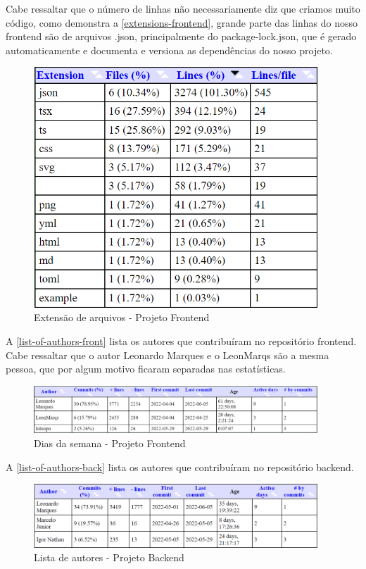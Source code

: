 Cabe ressaltar que o número de linhas não necessariamente diz que criamos muito código, como demonstra a \autoref{extensions-frontend}, grande parte das linhas do nosso frontend são de arquivos .json, principalmente do package-lock.json, que é gerado automaticamente e documenta e versiona as dependências do nosso projeto.
\begin{figure}[H]
	\centering
	\caption{\label{extensions-frontend}Extensão de arquivos - Projeto Frontend}
	\includegraphics[width=0.95\textwidth]{../imagens/stats/extensions-frontend.png}
\end{figure}

A \autoref{list-of-authors-front} lista os autores que contribuíram no repositório frontend. Cabe ressaltar que o autor Leonardo Marques e o LeonMarqs são a mesma pessoa, que por algum motivo ficaram separadas nas estatísticas.
\begin{figure}[H]
	\centering
	\caption{\label{list-of-authors-front}Dias da semana - Projeto Frontend}
	\includegraphics[width=0.95\textwidth]{../imagens/stats/list-of-authors-frontend.png}
\end{figure}

A \autoref{list-of-authors-back} lista os autores que contribuíram no repositório backend.
\begin{figure}[H]
	\centering
	\caption{\label{list-of-authors-back}Lista de autores - Projeto Backend}
	\includegraphics[width=0.95\textwidth]{../imagens/stats/list-of-authors-backend.png}
\end{figure}

